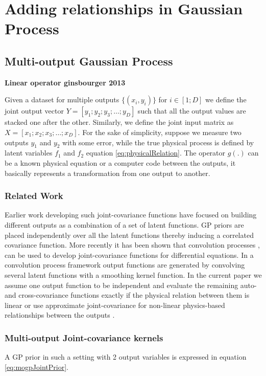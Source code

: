 \chapter{Adding relationships in Gaussian Process}
\label{chapAddingEquationsInGP}

\section{Multi-output Gaussian Process}\label{sec:mogp}
\textbf{Linear operator ginsbourger 2013}

\noindent Given a dataset for multiple outputs \(\{(x_{i}, y_{i})\}\) for \(i \in [1; D]\) we define the joint output vector \(Y = [y_{1}; y_{2}; y_{3}; \ldots; y_{D}]\) such that all the output values are stacked one after the other. Similarly, we define the joint input matrix as \(X = [x_{1}; x_{2}; x_{3}; \ldots; x_{D}]\). For the sake of simplicity, suppose we measure two outputs  \(y_{1}\) and \(y_{2}\) with some error, while the true physical process is defined by latent variables \(f_{1}\) and \(f_{2}\) equation \ref{eq:physicalRelation}. The operator \(g(.)\) can be a known physical equation or a computer code between the outputs, it basically represents a transformation from one output to another. 

\subsection{Related Work}\label{subsec:MOGPrelatedWork}
Earlier work developing such joint-covariance functions \cite{bonilla_multi-task_2008} have focused on  building different outputs as a combination of a set of latent functions. GP priors are placed independently over all the latent functions thereby inducing a correlated covariance function. More recently it has been shown that convolution processes \cite{journals/jmlr/AlvarezLL09} ,   \cite{Boyle05dependentgaussian} can be used to develop joint-covariance functions for differential equations. In a convolution process framework output functions are generated by convolving several latent functions with a smoothing kernel function. In the current paper we assume one output function to be independent and evaluate the remaining auto- and cross-covariance functions exactly if the physical relation between them is linear \cite{NIPSDerivativeGP} or use approximate joint-covariance for non-linear physics-based relationships between the outputs \cite{Constantinescu2013}.

\subsection{Multi-output Joint-covariance kernels}\label{sub:MOGPs}
A GP prior in such a setting with 2 output variables is expressed in equation \ref{eq:mogpJointPrior}.  

